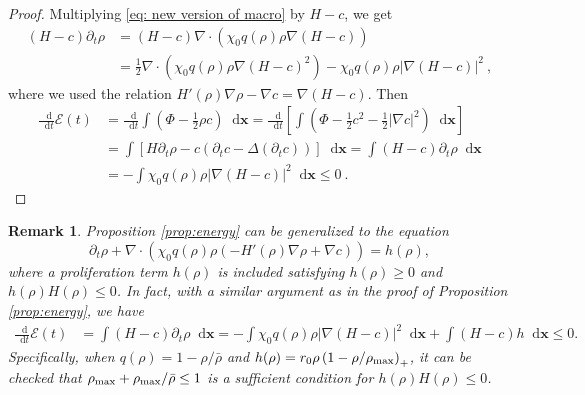 \documentclass{article}
\newtheorem{remark}{Remark}
\newcommand {\bx} { {\mathbf{x}} }
\newcommand*\diff{\mathop{}\!\mathrm{d}}
\begin{document}
 
\begin{proof}
 Multiplying \eqref{eq: new version of macro} by $H- c$, we get
\begin{align}
    (H-c)\partial_t\rho & =(H-c)\nabla\cdot(\chi_0 q(\rho)\rho\nabla(H-c))\nonumber\\ & = \frac{1}{2}\nabla\cdot\left( \chi_0 q(\rho)\rho\nabla(H-c)^2\right)-\chi_0 q(\rho)\rho|\nabla(H-c)|^2 \ ,\nonumber
\end{align}
where we used the relation $H'(\rho)\nabla\rho-\nabla c=\nabla(H-c)$.
Then
\begin{align*}
    \frac{\diff}{\diff t}\mathcal{E}(t) & = \frac{\diff }{\diff t}\int \left(\Phi-\frac{1}{2}\rho c \right)\diff \bx
    = \frac{\diff }{\diff t} \left[\int \left(\Phi-\frac{1}{2} c^2 -\frac{1}{2} |\nabla c|^2 \right)\diff \bx\right]\\
    & = \int\left[ H\partial_t\rho - c \left(\partial_t c - \Delta(\partial_t c)\right) \right] \diff \bx  = \int (H - c)\partial_t\rho \diff \bx \\
    &=-\int \chi_0 q(\rho)\rho|\nabla(H-c)|^2\diff \bx\leq 0\ .
\end{align*}
\end{proof}
\begin{remark}\label{rem 6}
Proposition \ref{prop:energy} can be generalized to the equation 
\begin{equation*}
    \partial_t\rho+\nabla\cdot(\chi_0 q(\rho)\rho(-H'(\rho)\nabla\rho+\nabla c))=h(\rho),
\end{equation*}
{ where a proliferation term $h(\rho)$ is included satisfying $h(\rho)\ge0$ and $h(\rho)H(\rho)\le0$. 
In fact, with a similar argument as in the proof of Proposition \ref{prop:energy}, we have 
\begin{align*}
    \frac{\diff}{\diff t}\mathcal{E}(t) & = \int (H - c)\partial_t\rho \diff \bx 
    =-\int \chi_0 q(\rho)\rho|\nabla(H-c)|^2\diff \bx + \int (H-c) h \diff \bx \le 0.
\end{align*}
Specifically, when $q(\rho) = 1 - \rho / \bar{\rho}$ and $h(\rho) = r_0 \rho\left(1 - \rho/\rho_{\rm max}\right)_+$, it can be checked that $\rho_{\rm max} + \rho_{\rm max} / \bar{\rho} \le1$ is a sufficient condition for  $h(\rho)H(\rho)\le0$. }
\end{remark}
\end{document}
